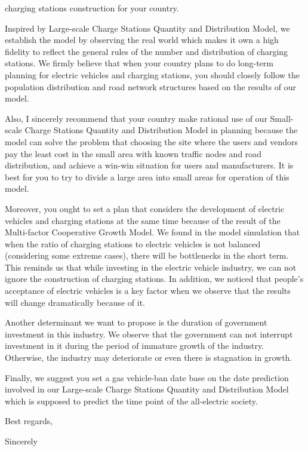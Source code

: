 \documentclass{mcmthesis}
\begin{document}
	charging stations construction for your country.
	\par
	Inspired by Large-scale Charge Stations Quantity and Distribution Model, we establish the model by observing the real world which makes it own a high fidelity to reflect the general rules of the number and distribution of charging stations. We firmly believe that when your country plans to do long-term planning for electric vehicles and charging stations, you should closely follow the population distribution and road network structures based on the results of our model.
	\par
	Also, I sincerely recommend that your country make rational use of our Small-scale Charge Stations Quantity and Distribution Model in planning because the model can solve the problem that choosing the site where the users and vendors pay the least cost in the small area with known traffic nodes and road distribution, and achieve a win-win situation for users and manufacturers. It is best for you to try to divide a large area into small areas for operation of this model.
	\par
	Moreover, you ought to set a plan that considers the development of electric vehicles and charging stations at the same time because of the result of the Multi-factor Cooperative Growth Model. We found in the model simulation that when the ratio of charging stations to electric vehicles is not balanced (considering some extreme cases), there will be bottlenecks in the short term. This reminds us that while investing in the electric vehicle industry, we can not ignore the construction of charging stations. In addition, we noticed that people's acceptance of electric vehicles is a key factor when we observe that the results will change dramatically because of it. 
	\par
	Another determinant we want to propose is the duration of government investment in this industry. We observe that the government can not interrupt investment in it during the period of immature growth of the industry. Otherwise, the industry may deteriorate or even there is stagnation in growth.
	\par
	Finally, we suggest you set a gas vehicle-ban date base on the date prediction involved in our Large-scale Charge Stations Quantity and Distribution Model which is supposed to predict the time point of the all-electric society.
	\par
	Best regards,
	\par
	Sincerely
	\newpage
\end{document}
